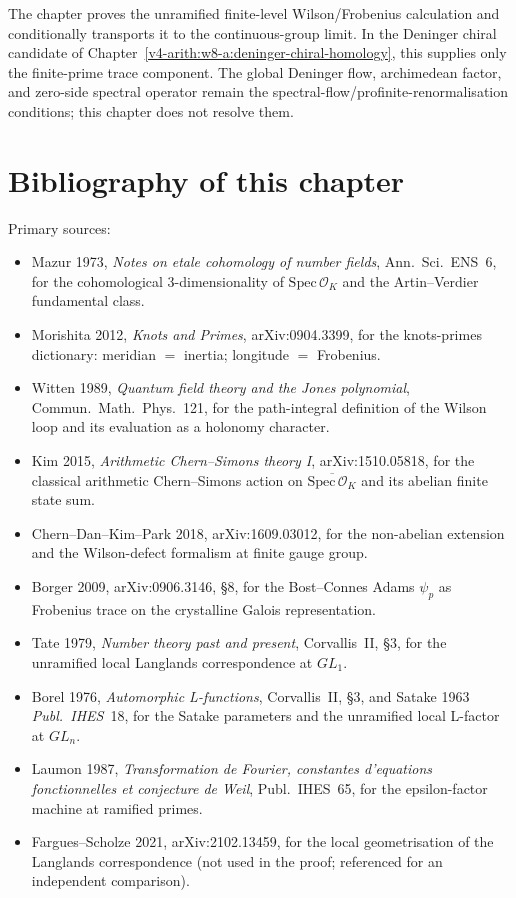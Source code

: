 The chapter proves the unramified finite-level Wilson/Frobenius
calculation and conditionally transports it to the continuous-group
limit. In the Deninger chiral candidate of
Chapter~\ref{v4-arith:w8-a:deninger-chiral-homology}, this supplies
only the finite-prime trace component. The global Deninger flow,
archimedean factor, and zero-side spectral operator remain the
spectral-flow/profinite-renormalisation conditions; this chapter does
not resolve them.

\section*{Bibliography of this chapter}
\label{v4-arith:w9-r1:biblio}

Primary sources:

\begin{itemize}
\item Mazur 1973, \emph{Notes on etale cohomology of number fields},
Ann.~Sci.~ENS~6, for the cohomological 3-dimensionality of
\(\mathrm{Spec}\,\mathcal O_{K}\) and the Artin--Verdier
fundamental class.
\item Morishita 2012, \emph{Knots and Primes}, arXiv:0904.3399,
for the knots-primes dictionary: meridian \(=\) inertia; longitude
\(=\) Frobenius.
\item Witten 1989, \emph{Quantum field theory and the Jones
polynomial}, Commun.~Math.~Phys.~121, for the path-integral
definition of the Wilson loop and its evaluation as a holonomy
character.
\item Kim 2015, \emph{Arithmetic Chern--Simons theory I},
arXiv:1510.05818, for the classical arithmetic Chern--Simons
action on \(\overline{\mathrm{Spec}\,\mathcal O_{K}}\) and its
abelian finite state sum.
\item Chern--Dan--Kim--Park 2018, arXiv:1609.03012, for the
non-abelian extension and the Wilson-defect formalism at finite
gauge group.
\item Borger 2009, arXiv:0906.3146, \S8, for the
Bost--Connes Adams \(\psi_{p}\) as Frobenius trace on the
crystalline Galois representation.
\item Tate 1979, \emph{Number theory past and present},
Corvallis~II, \S3, for the unramified local Langlands
correspondence at \(GL_{1}\).
\item Borel 1976, \emph{Automorphic L-functions}, Corvallis~II,
\S3, and Satake 1963 \emph{Publ.~IHES}~18, for the Satake
parameters and the unramified local L-factor at \(GL_{n}\).
\item Laumon 1987, \emph{Transformation de Fourier, constantes
d'equations fonctionnelles et conjecture de Weil},
Publ.~IHES~65, for the epsilon-factor machine at ramified
primes.
\item Fargues--Scholze 2021, arXiv:2102.13459, for the local
geometrisation of the Langlands correspondence (not used in the
proof; referenced for an independent comparison).
\end{itemize}
